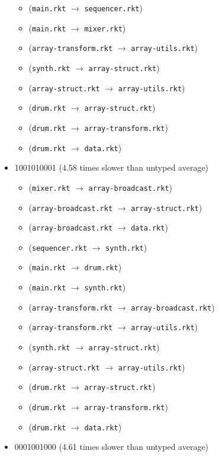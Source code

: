 \documentclass{article}
\newcommand{\mono}[1]{\texttt{#1}}
\begin{document}
\begin{itemize}
\begin{itemize}
  \item (\mono{main.rkt} $\rightarrow$ \mono{sequencer.rkt})
  \item (\mono{main.rkt} $\rightarrow$ \mono{mixer.rkt})
  \item (\mono{array-transform.rkt} $\rightarrow$ \mono{array-utils.rkt})
  \item (\mono{synth.rkt} $\rightarrow$ \mono{array-struct.rkt})
  \item (\mono{array-struct.rkt} $\rightarrow$ \mono{array-utils.rkt})
  \item (\mono{drum.rkt} $\rightarrow$ \mono{array-struct.rkt})
  \item (\mono{drum.rkt} $\rightarrow$ \mono{array-transform.rkt})
  \item (\mono{drum.rkt} $\rightarrow$ \mono{data.rkt})
  \end{itemize}
\item 1001010001 (4.58 times slower than untyped average)
  \begin{itemize}
  \item (\mono{mixer.rkt} $\rightarrow$ \mono{array-broadcast.rkt})
  \item (\mono{array-broadcast.rkt} $\rightarrow$ \mono{array-struct.rkt})
  \item (\mono{array-broadcast.rkt} $\rightarrow$ \mono{data.rkt})
  \item (\mono{sequencer.rkt} $\rightarrow$ \mono{synth.rkt})
  \item (\mono{main.rkt} $\rightarrow$ \mono{drum.rkt})
  \item (\mono{main.rkt} $\rightarrow$ \mono{synth.rkt})
  \item (\mono{array-transform.rkt} $\rightarrow$ \mono{array-broadcast.rkt})
  \item (\mono{array-transform.rkt} $\rightarrow$ \mono{array-utils.rkt})
  \item (\mono{synth.rkt} $\rightarrow$ \mono{array-struct.rkt})
  \item (\mono{array-struct.rkt} $\rightarrow$ \mono{array-utils.rkt})
  \item (\mono{drum.rkt} $\rightarrow$ \mono{array-struct.rkt})
  \item (\mono{drum.rkt} $\rightarrow$ \mono{array-transform.rkt})
  \item (\mono{drum.rkt} $\rightarrow$ \mono{data.rkt})
  \end{itemize}
\item 0001001000 (4.61 times slower than untyped average)
  \begin{itemize}

\end{itemize}
\end{itemize}
\end{document}
